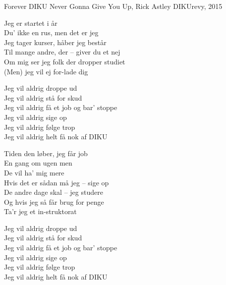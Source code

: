 \begin{song}{Forever DIKU}
  {} %
  {Never Gonna Give You Up, Rick Astley} %
  {} %
  {DIKUrevy, 2015} %
  {\NotCCLIed} %

  \begin{SBVerse}
    Jeg er startet i år\\
    Du' ikke en rus, men det er jeg\\
    Jeg tager kurser, håber jeg består\\
    Til mange andre, der -- giver du et nej\\
    Om mig ser jeg folk der dropper studiet\\
    (Men) jeg vil ej for-lade dig
  \end{SBVerse}

  \begin{SBChorus}
    Jeg vil aldrig droppe ud\\
    Jeg vil aldrig stå for skud\\
    Jeg vil aldrig få et job og bar' stoppe\\
    Jeg vil aldrig sige op\\
    Jeg vil aldrig følge trop\\
    Jeg vil aldrig helt få nok af DIKU
  \end{SBChorus}

  \begin{SBVerse}
    Tiden den løber, jeg får job\\
    En gang om ugen men\\
    De vil ha' mig mere\\
    Hvis det er sådan må jeg -- sige op\\
    De andre dage skal -- jeg studere\\
    Og hvis jeg så får brug for penge\\
    Ta'r jeg et in-struktorat
  \end{SBVerse}

  \begin{SBChorus}
    Jeg vil aldrig droppe ud\\
    Jeg vil aldrig stå for skud\\
    Jeg vil aldrig få et job og bar' stoppe\\
    Jeg vil aldrig sige op\\
    Jeg vil aldrig følge trop\\
    Jeg vil aldrig helt få nok af DIKU
  \end{SBChorus}


\end{song}
